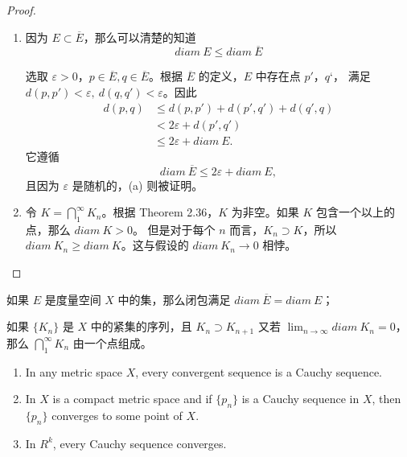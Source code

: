 \documentclass[../poma-notes.tex]{subfiles}
\begin{document}
\begin{proof}
  \begin{enumerate}[label=(\alph*)]
    \item 因为 $E \subset \overline{E}$，那么可以清楚的知道
          \[diam\ E \le diam\ \overline{E}\]

          选取 $\varepsilon > 0$，$p \in \overline{E}, q \in \overline{E}$。根据 $\overline{E}$ 的定义，$E$ 中存在点 $p'$，$q‘$，
          满足 $d(p,p') < \varepsilon,\ d(q,q') < \varepsilon$。因此
          \begin{align*}
            \mathcal{} d(p,q) & \le d(p,p') + d(p',q') + d(q',q) \\
                              & < 2\varepsilon + d(p',q')        \\
                              & \le 2\varepsilon + diam\ E.
          \end{align*}
          它遵循
          \[diam\ \overline{E} \le 2\varepsilon + diam\ E,\]
          且因为 $\varepsilon$ 是随机的，(a) 则被证明。
    \item 令 $K = \bigcap_1^{\infty} K_n$。根据 Theorem 2.36，$K$ 为非空。如果 $K$ 包含一个以上的点，那么 $diam\ K > 0$。
          但是对于每个 $n$ 而言，$K_n \supset K$，所以 $diam\ K_n \ge diam\ K$。这与假设的 $diam\ K_n \to 0$ 相悖。
  \end{enumerate}
\end{proof}

\begin{anote}
  \begin{enumerate*}[label=(\alph*)]
    \item 如果 $E$ 是度量空间 $X$ 中的集，那么闭包满足 $diam\ \overline{E} = diam\ E$；
    \item 如果 $\{K_n\}$ 是 $X$ 中的紧集的序列，且 $K_n \supset K_{n+1}$ 又若 $\lim_{n \to \infty} diam\ K_n = 0$，
          那么 $\bigcap_1^{\infty} K_n$ 由一个点组成。
  \end{enumerate*}
\end{anote}

\begin{theorem}\mbox{}
  \begin{enumerate}
    \item In any metric space $X$, every convergent sequence is a Cauchy sequence.
    \item In $X$ is a compact metric space and if $\{p_n\}$ is a Cauchy sequence in $X$, then $\{p_n\}$ converges to
          some point of $X$.
    \item In $R^k$, every Cauchy sequence converges.
  \end{enumerate}
\end{theorem}
\end{document}
